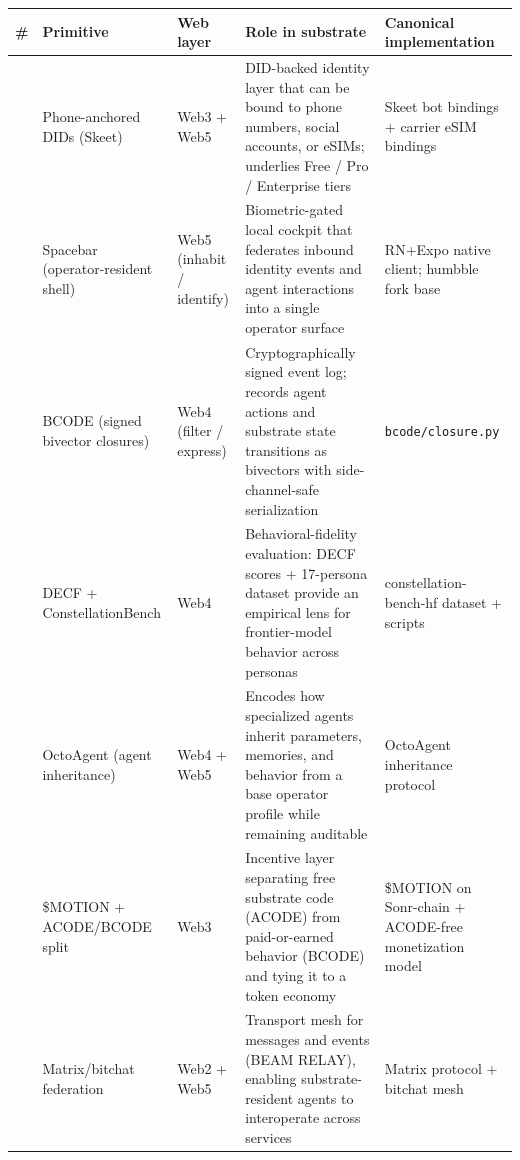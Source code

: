 {\def\LTcaptype{none} %
\begin{longtable}[]{@{}
  >{\raggedright\arraybackslash}p{}
  >{\raggedright\arraybackslash}p{}
  >{\raggedright\arraybackslash}p{}
  >{\raggedright\arraybackslash}p{}
  >{\raggedright\arraybackslash}p{}@{}}
\toprule\noalign{}
\begin{minipage}[b]{\linewidth}\raggedright
\#
\end{minipage} & \begin{minipage}[b]{\linewidth}\raggedright
Primitive
\end{minipage} & \begin{minipage}[b]{\linewidth}\raggedright
Web layer
\end{minipage} & \begin{minipage}[b]{\linewidth}\raggedright
Role in substrate
\end{minipage} & \begin{minipage}[b]{\linewidth}\raggedright
Canonical implementation
\end{minipage} \\
\midrule\noalign{}
\endhead
\bottomrule\noalign{}
\endlastfoot
1 & Phone-anchored DIDs (Skeet) & Web3 + Web5 & DID-backed identity
layer that can be bound to phone numbers, social accounts, or eSIMs;
underlies Free / Pro / Enterprise tiers & Skeet bot bindings + carrier
eSIM bindings \\
2 & Spacebar (operator-resident shell) & Web5 (inhabit / identify) &
Biometric-gated local cockpit that federates inbound identity events and
agent interactions into a single operator surface & RN+Expo native
client; humbble fork base \\
3 & BCODE (signed bivector closures) & Web4 (filter / express) &
Cryptographically signed event log; records agent actions and substrate
state transitions as bivectors with side-channel-safe serialization &
\texttt{bcode/closure.py} \\
4 & DECF + ConstellationBench & Web4 & Behavioral-fidelity evaluation:
DECF scores + 17-persona dataset provide an empirical lens for
frontier-model behavior across personas & constellation-bench-hf dataset
+ scripts \\
5 & OctoAgent (agent inheritance) & Web4 + Web5 & Encodes how
specialized agents inherit parameters, memories, and behavior from a
base operator profile while remaining auditable & OctoAgent inheritance
protocol \\
6 & \$MOTION + ACODE/BCODE split & Web3 & Incentive layer separating
free substrate code (ACODE) from paid-or-earned behavior (BCODE) and
tying it to a token economy & \$MOTION on Sonr-chain + ACODE-free
monetization model \\
7 & Matrix/bitchat federation & Web2 + Web5 & Transport mesh for
messages and events (BEAM RELAY), enabling substrate-resident agents to
interoperate across services & Matrix protocol + bitchat mesh \\
\end{longtable}
}

